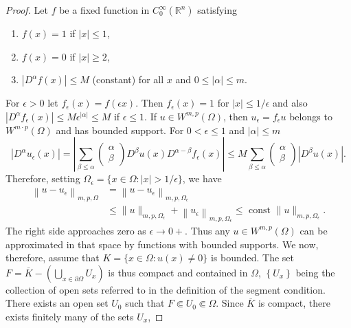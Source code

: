 \begin{proof}
  Let $f$ be a fixed function in $C_0^{\infty}\left(\mathbb{R}^n\right)$ satisfying
  \begin{enumerate}[label = (\roman*)]
    \item $f(x)=1$ if $|x| \leq 1$,
    \item $f(x)=0$ if $|x| \geq 2$,
    \item $\left|D^\alpha f(x)\right| \leq M$ (constant) for all $x$ and $0 \leq|\alpha| \leq m$.
  \end{enumerate}
  For $\epsilon>0$ let $f_\epsilon(x)=f(\epsilon x)$.
  Then $f_\epsilon(x)=1$ for $|x| \leq 1 / \epsilon$
  and also $\left|D^\alpha f_\epsilon(x)\right| \leq M \epsilon^{|\alpha|} \leq M$
  if $\epsilon \leq 1$. If $u \in W^{m, p}(\Omega)$, then $u_\epsilon=f_\epsilon u$
  belongs to $W^{m \cdot p}(\Omega)$ and has bounded support.
  For $0<\epsilon \leq 1$ and $|\alpha| \leq m$
  \[
  \left|D^\alpha u_\epsilon(x)\right|=\left|\sum_{\beta \leq \alpha}\left(\begin{array}{c}
  \alpha \\
  \beta
  \end{array}\right) D^\beta u(x) D^{\alpha-\beta} f_\epsilon(x)\right| \leq M \sum_{\beta \leq \alpha}\left(\begin{array}{c}
  \alpha \\
  \beta
  \end{array}\right)\left|D^\beta u(x)\right| .
  \]
  Therefore, setting $\Omega_\epsilon=\{x \in \Omega:|x|>1 / \epsilon\}$, we have
  \[
  \begin{aligned}
  \left\|u-u_\epsilon\right\|_{m, p, \Omega} & =\left\|u-u_\epsilon\right\|_{m, p, \Omega_\epsilon} \\
  & \leq\|u\|_{m, p, \Omega_\epsilon}+\left\|u_\epsilon\right\|_{m, p, \Omega_\epsilon} \leq \text { const }\|u\|_{m, p, \Omega_\epsilon} .
  \end{aligned}
  \]
  The right side approaches zero as $\epsilon \rightarrow 0+$.
  Thus any $u \in W^{m, p}(\Omega)$ can be approximated in that space by functions
  with bounded supports.
  We now, therefore, assume that $K=\{x \in \Omega: u(x) \neq 0\}$ is bounded.
  The set $F=\overline{K}-\left(\bigcup_{x \in\partial\Omega} U_x\right)$
  is thus compact and contained in $\Omega$, $\left\{U_x\right\}$
  being the collection of open sets 
  referred to in the definition of the segment condition.
  There exists an open set $U_0$ such that $F \Subset U_0 \Subset \Omega$.
  Since $\overline{K}$ is compact, there exists finitely many of the sets $U_x$,

\end{proof}
